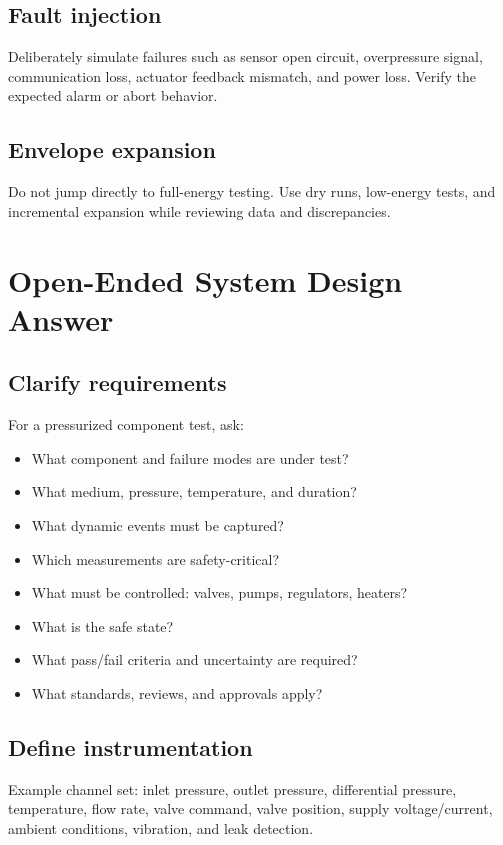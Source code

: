 \documentclass[11pt]{article}
\begin{document}
\subsection{Fault injection}
Deliberately simulate failures such as sensor open circuit, overpressure signal,
communication loss, actuator feedback mismatch, and power loss. Verify the
expected alarm or abort behavior.

\subsection{Envelope expansion}
Do not jump directly to full-energy testing. Use dry runs, low-energy tests, and
incremental expansion while reviewing data and discrepancies.

\section{Open-Ended System Design Answer}

\subsection{Clarify requirements}
For a pressurized component test, ask:
\begin{itemize}
  \item What component and failure modes are under test?
  \item What medium, pressure, temperature, and duration?
  \item What dynamic events must be captured?
  \item Which measurements are safety-critical?
  \item What must be controlled: valves, pumps, regulators, heaters?
  \item What is the safe state?
  \item What pass/fail criteria and uncertainty are required?
  \item What standards, reviews, and approvals apply?
\end{itemize}

\subsection{Define instrumentation}
Example channel set: inlet pressure, outlet pressure, differential pressure,
temperature, flow rate, valve command, valve position, supply voltage/current,
ambient conditions, vibration, and leak detection.
\end{document}
